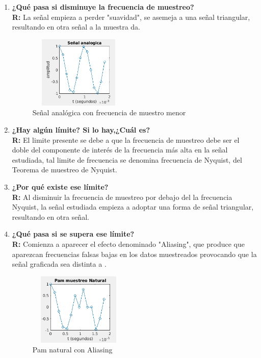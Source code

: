 \begin{enumerate}
    \item \textbf{¿Qué pasa si disminuye la frecuencia de muestreo?}\\
    \textbf{R:}
    La señal empieza a perder "suavidad", se asemeja a una señal triangular, resultando en otra señal a la muestra da.
    
    \begin{figure}[H]
        \centering
        \includegraphics[height=130px, width=180px]{Imagenes/Actividad1/Preguntas/fMinSA.png}
        \caption{Señal analógica con frecuencia de muestro menor}
        \label{fig:fmMinSA}
    \end{figure}
    
    
    \item \textbf{¿Hay algún límite? Si lo hay,¿Cuál es?}\\
    \textbf{R:}
    El limite presente se debe a que la  frecuencia de muestreo debe ser el doble del componente de interés de la frecuencia más alta en la señal estudiada, tal limite de frecuencia se denomina frecuencia de Nyquist, del Teorema de muestreo de Nyquist.\\
    
    \item \textbf{¿Por qué existe ese límite?}\\
    \textbf{R:}
    Al disminuir la frecuencia de muestreo por debajo del la frecuencia Nyquist, la señal estudiada empieza a adoptar una forma de señal triangular, resultando en otra señal.\\
    
    \item \textbf{¿Qué pasa si se supera ese límite?}\\
    \textbf{R:}
    Comienza a aparecer el efecto denominado "Aliasing", que produce que aparezcan frecuencias falsas bajas en los datos muestreados provocando que la señal graficada sea distinta a .\\
    \begin{figure}[H]
        \centering
        \includegraphics[height=130px, width=180px]{Imagenes/Actividad1/Preguntas/ALIpam.png}
        \caption{Pam natural con Aliasing}
        \label{fig:PlanaAliasing}
    \end{figure}


\end{enumerate}
